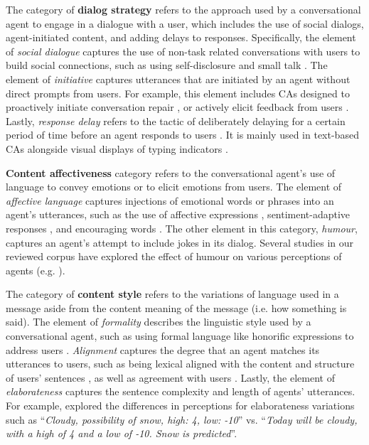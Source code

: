 The category of \textbf{dialog strategy} refers to the approach used by a conversational agent to engage in a dialogue with a user, which includes the use of social dialogs, agent-initiated content, and adding delays to responses. Specifically, the element of \textit{social dialogue} captures the use of non-task related conversations with users to build social connections, such as using self-disclosure \cite{lee2020hear}\cmt{[23]} and small talk \cite{lubold2016effects, volkel2021manipulating}\cmt{[86][68]}. The element of \textit{initiative} captures utterances that are initiated by an agent without direct prompts from users. For example, this element includes CAs designed to proactively initiate conversation repair \cite{ashktorab2019resilient, cuadra2021my}\cmt{[88][67]}, or actively elicit feedback from users \cite{xiao2021let}\cmt{[73]}. Lastly, \textit{response delay} refers to the tactic of deliberately delaying for a certain period of time before an agent responds to users \cite{gnewuch2018faster, gnewuch2022opposing}\cmt{[19][20]}. It is mainly used in text-based CAs alongside visual displays of typing indicators \cite{gnewuch2018chatbot}\cmt{[21]}.

\textbf{Content affectiveness} category refers to the conversational agent's use of language to convey emotions or to elicit emotions from users. The  element of \textit{affective language} captures injections of emotional words or phrases into an agent's utterances, such as the use of affective expressions \cite{seeger2021chatbots, yang2017perceived, zhu2022effects}\cmt{[35][44][26]}, sentiment-adaptive responses \cite{diederich2019emulating}\cmt{[25]}, and encouraging words \cite{healey2013relating}\cmt{[39]}. The other element in this category, \textit{humour}, captures an agent's attempt to include jokes in its dialog. Several studies in our reviewed corpus have explored the effect of humour on various perceptions of agents (e.g. \cite{ceha2021can, khooshabeh2011does}\cmt{[57][37]}).

The category of \textbf{content style} refers to the variations of language used in a message aside from the content meaning of the message (i.e. how something is said). The element of \textit{formality} describes the linguistic style used by a conversational agent, such as using formal language like honorific expressions to address users \cite{ouchi2019should}\cmt{[59]}. \textit{Alignment} captures the degree that an agent matches its utterances to users, such as being lexical aligned with the content and structure of users' sentences \cite{huiyang2022improving, linnemann2018can}\cmt{[17][15]}, as well as agreement with users \cite{volkel2021examining}\cmt{[69]}. Lastly, the element of \textit{elaborateness} captures the sentence complexity and length of agents' utterances. For example, \citet{roy2021users}\cmt{[71]} explored the differences in perceptions for elaborateness variations such as ``\textit{Cloudy, possibility of snow, high: 4, low: -10}'' vs. ``\textit{Today will be cloudy, with a high of 4 and a low of -10. Snow is predicted}''.

